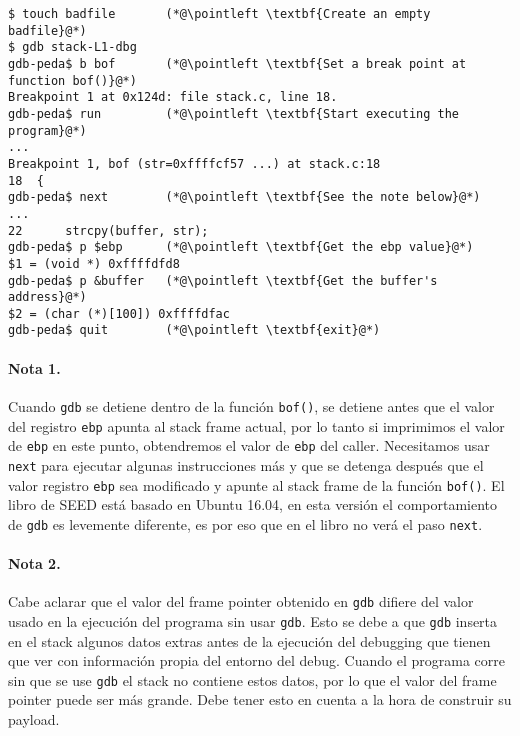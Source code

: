 \newcommand{\pointleft}{\reflectbox{\ding{221}}\xspace}

\begin{lstlisting}
$ touch badfile       (*@\pointleft \textbf{Create an empty badfile}@*)
$ gdb stack-L1-dbg
gdb-peda$ b bof       (*@\pointleft \textbf{Set a break point at function bof()}@*)
Breakpoint 1 at 0x124d: file stack.c, line 18.
gdb-peda$ run         (*@\pointleft \textbf{Start executing the program}@*)
...
Breakpoint 1, bof (str=0xffffcf57 ...) at stack.c:18
18  {
gdb-peda$ next        (*@\pointleft \textbf{See the note below}@*)
...
22	    strcpy(buffer, str);
gdb-peda$ p $ebp      (*@\pointleft \textbf{Get the ebp value}@*)
$1 = (void *) 0xffffdfd8   
gdb-peda$ p &buffer   (*@\pointleft \textbf{Get the buffer's address}@*)
$2 = (char (*)[100]) 0xffffdfac
gdb-peda$ quit        (*@\pointleft \textbf{exit}@*)
\end{lstlisting}

  
\paragraph{Nota 1.} Cuando \texttt{gdb} se detiene dentro de la función \texttt{bof()}, se detiene antes que el valor del registro \texttt{ebp} apunta al stack frame actual, por lo tanto si imprimimos el valor de \texttt{ebp} en este punto, obtendremos el valor de \texttt{ebp} del caller. Necesitamos usar \texttt{next} para ejecutar algunas instrucciones más y que se detenga después que el valor registro \texttt{ebp} sea modificado y apunte al stack frame de la función \texttt{bof()}.
El libro de SEED está basado en Ubuntu 16.04, en esta versión el comportamiento de \texttt{gdb} es levemente diferente, es por eso que en el libro no verá el paso \texttt{next}.

\paragraph{Nota 2.}
Cabe aclarar que el valor del frame pointer obtenido en \texttt{gdb} difiere del valor usado en la ejecución del programa sin usar \texttt{gdb}. Esto se debe a que \texttt{gdb} inserta en el stack algunos datos extras antes de la ejecución del debugging que tienen que ver con información propia del entorno del debug.
Cuando el programa corre sin que se use \texttt{gdb} el stack no contiene estos datos, por lo que el valor del frame pointer puede ser más grande. Debe tener esto en cuenta a la hora de construir su payload.


